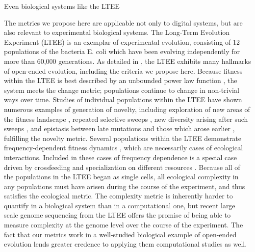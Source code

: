 \documentclass[letterpaper]{article}
\begin{document}
Even biological systems like the LTEE

The metrics we propose here are applicable not only to digital systems, but are also relevant to experimental biological systems.  The Long-Term Evolution Experiment (LTEE) \citep{lenski_long-term_1991} is an exemplar of experimental evolution, consisting of 12 populations of the bacteria E. coli which have been evolving independently for more than 60,000 generations.  As detailed in \citep{taylor_open_inpress}, the LTEE exhibits many hallmarks of open-ended evolution, including the criteria we propose here.  Because fitness within the LTEE is best described by an unbounded power law function \citep{wiser_long-term_2013,lenski_sustained_2015}, the system meets the change metric; populations continue to change in non-trivial ways over time.  Studies of individual populations within the LTEE have shown numerous examples of generation of novelty, including exploration of new areas of the fitness landscape \citep{tenaillon_tempo_2016}, repeated selective sweeps \citep{maddamsetti_adaptation_2015}, new diversity arising after such sweeps \citep{blount_genomic_2012}, and epistasis between late mutations and those which arose earlier \citep{wielgoss_mutation_2013}, fulfilling the novelty metric.  Several populations within the LTEE demonstrate frequency-dependent fitness dynamics \citep{ribeck_modeling_2015,rozen_longterm_2000,le_gac_ecological_2012,maddamsetti_adaptation_2015}, which are necessarily cases of ecological interactions.  Included in these cases of frequency dependence is a special case \citep{blount_historical_2008,blount_genomic_2012,turner_replaying_2015} driven by crossfeeding and specialization on different resources \citep{turner_evolution_2015}.  Because all of the populations in the LTEE began as single cells, all ecological complexity in any populations must have arisen during the course of the experiment, and thus satisfies the  ecological metric.  The complexity metric is inherently harder to quantify in a biological system than in a computational one, but recent large scale genome sequencing from the LTEE \citep{tenaillon_tempo_2016} offers the promise of being able to measure complexity at the genome level over the course of the experiment.  The fact that our metrics work in a well-studied biological example of open-ended evolution lends greater credence to applying them computational studies as well.




\end{document}
